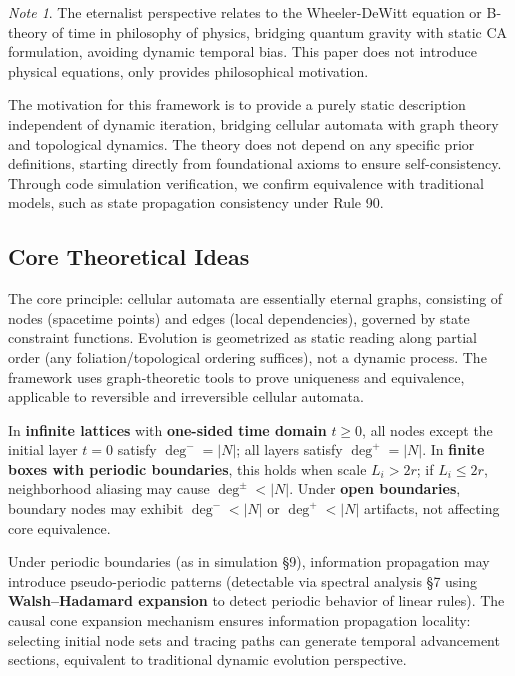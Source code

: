 \documentclass[11pt]{article}
\theoremstyle{definition}
\theoremstyle{remark}
\newtheorem*{note}{Note}
\begin{document}
\begin{note}
The eternalist perspective relates to the Wheeler-DeWitt equation or B-theory of time in philosophy of physics, bridging quantum gravity with static CA formulation, avoiding dynamic temporal bias. This paper does not introduce physical equations, only provides philosophical motivation.
\end{note}

The motivation for this framework is to provide a purely static description independent of dynamic iteration, bridging cellular automata with graph theory and topological dynamics. The theory does not depend on any specific prior definitions, starting directly from foundational axioms to ensure self-consistency. Through code simulation verification, we confirm equivalence with traditional models, such as state propagation consistency under Rule 90.

\subsection{Core Theoretical Ideas}

The core principle: cellular automata are essentially eternal graphs, consisting of nodes (spacetime points) and edges (local dependencies), governed by state constraint functions. Evolution is geometrized as static reading along partial order (any foliation/topological ordering suffices), not a dynamic process. The framework uses graph-theoretic tools to prove uniqueness and equivalence, applicable to reversible and irreversible cellular automata.

In \textbf{infinite lattices} with \textbf{one-sided time domain} \( t\ge 0 \), all nodes except the initial layer \( t=0 \) satisfy \( \deg^- = |N| \); all layers satisfy \( \deg^+ = |N| \). In \textbf{finite boxes with periodic boundaries}, this holds when scale \( L_i>2r \); if \( L_i\le 2r \), neighborhood aliasing may cause \( \deg^\pm<|N| \). Under \textbf{open boundaries}, boundary nodes may exhibit \( \deg^-<|N| \) or \( \deg^+<|N| \) artifacts, not affecting core equivalence.

Under periodic boundaries (as in simulation §9), information propagation may introduce pseudo-periodic patterns (detectable via spectral analysis §7 using \textbf{Walsh--Hadamard expansion} to detect periodic behavior of linear rules). The causal cone expansion mechanism ensures information propagation locality: selecting initial node sets and tracing paths can generate temporal advancement sections, equivalent to traditional dynamic evolution perspective.
\end{document}
